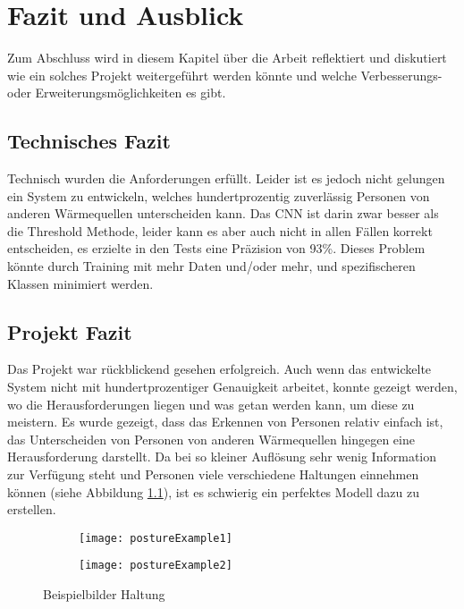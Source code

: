 \chapter{Fazit und Ausblick}
\label{ch:Ausblick}

Zum Abschluss wird in diesem Kapitel über die Arbeit reflektiert und diskutiert wie ein solches Projekt weitergeführt werden könnte und welche Verbesserungs- oder Erweiterungsmöglichkeiten es gibt.

\section{Technisches Fazit}

Technisch wurden die Anforderungen erfüllt. Leider ist es jedoch nicht gelungen ein System zu entwickeln, welches hundertprozentig zuverlässig Personen von anderen Wärmequellen unterscheiden kann. Das \gls{CNN} ist darin zwar besser als die Threshold Methode, leider kann es aber auch nicht in allen Fällen korrekt entscheiden, es erzielte in den Tests eine Präzision von 93\%. Dieses Problem könnte durch Training mit mehr Daten und/oder mehr, und spezifischeren Klassen minimiert werden.

\section{Projekt Fazit}

Das Projekt war rückblickend gesehen erfolgreich. Auch wenn das entwickelte System nicht mit hundertprozentiger Genauigkeit arbeitet, konnte gezeigt werden, wo die Herausforderungen liegen und was getan werden kann, um diese zu meistern. Es wurde gezeigt, dass das Erkennen von Personen relativ einfach ist, das Unterscheiden von Personen von anderen Wärmequellen hingegen eine Herausforderung darstellt. Da bei so kleiner Auflösung sehr wenig Information zur Verfügung steht und Personen viele verschiedene Haltungen einnehmen können (siehe Abbildung \ref{fig:postureExample}), ist es schwierig ein perfektes Modell dazu zu erstellen.

\begin{figure}[H]
	\centering
	\begin{subfigure}{.4\linewidth}
		\centering
		\texttt{[image: postureExample1]}
	\end{subfigure}
	\begin{subfigure}{.4\linewidth}
		\centering
		\texttt{[image: postureExample2]}
	\end{subfigure}	
	\caption{Beispielbilder Haltung}
	\label{fig:postureExample}
\end{figure}

